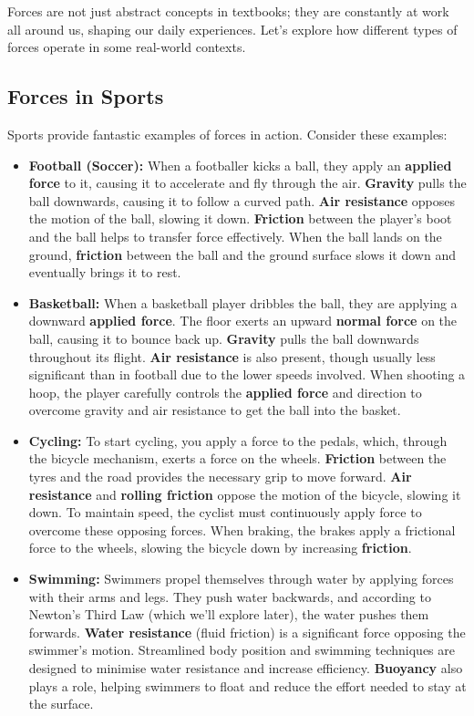 Forces are not just abstract concepts in textbooks; they are constantly at work all around us, shaping our daily experiences. Let's explore how different types of forces operate in some real-world contexts.

\subsection{Forces in Sports}

Sports provide fantastic examples of forces in action.  Consider these examples:

\begin{itemize}
    \item \textbf{Football (Soccer):} When a footballer kicks a ball, they apply an \textbf{applied force} to it, causing it to accelerate and fly through the air. \textbf{Gravity} pulls the ball downwards, causing it to follow a curved path.  \textbf{Air resistance} opposes the motion of the ball, slowing it down. \textbf{Friction} between the player's boot and the ball helps to transfer force effectively. When the ball lands on the ground, \textbf{friction} between the ball and the ground surface slows it down and eventually brings it to rest.

    \item \textbf{Basketball:}  When a basketball player dribbles the ball, they are applying a downward \textbf{applied force}. The floor exerts an upward \textbf{normal force} on the ball, causing it to bounce back up.  \textbf{Gravity} pulls the ball downwards throughout its flight. \textbf{Air resistance} is also present, though usually less significant than in football due to the lower speeds involved. When shooting a hoop, the player carefully controls the \textbf{applied force} and direction to overcome gravity and air resistance to get the ball into the basket.

    \item \textbf{Cycling:} To start cycling, you apply a force to the pedals, which, through the bicycle mechanism, exerts a force on the wheels.  \textbf{Friction} between the tyres and the road provides the necessary grip to move forward.  \textbf{Air resistance} and \textbf{rolling friction} oppose the motion of the bicycle, slowing it down.  To maintain speed, the cyclist must continuously apply force to overcome these opposing forces. When braking, the brakes apply a frictional force to the wheels, slowing the bicycle down by increasing \textbf{friction}.

    \item \textbf{Swimming:}  Swimmers propel themselves through water by applying forces with their arms and legs. They push water backwards, and according to Newton's Third Law (which we'll explore later), the water pushes them forwards.  \textbf{Water resistance} (fluid friction) is a significant force opposing the swimmer's motion.  Streamlined body position and swimming techniques are designed to minimise water resistance and increase efficiency.  \textbf{Buoyancy} also plays a role, helping swimmers to float and reduce the effort needed to stay at the surface.
\end{itemize}

